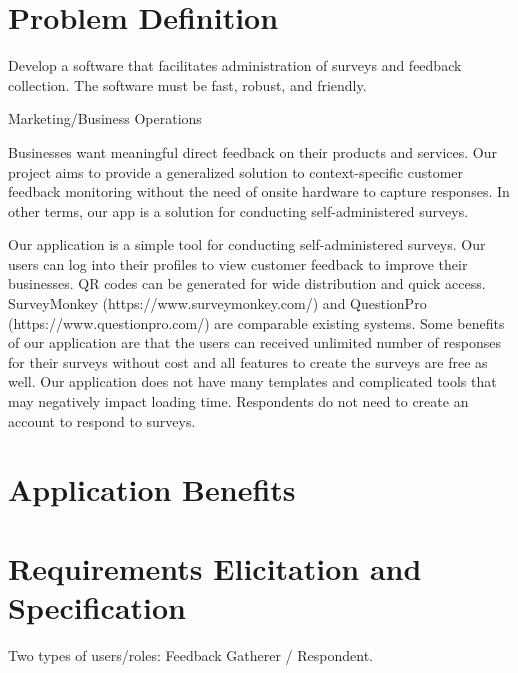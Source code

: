 \documentclass[letterpaper, 10 pt, conference]{ieeeconf}
\begin{document}
\thispagestyle{empty}
\pagestyle{empty}


\begin{abstract}
\end{abstract}


\section{Problem Definition}
Develop a software that facilitates administration of surveys and feedback collection. The software must be fast, robust, and friendly.

Marketing/Business Operations 

Businesses want meaningful direct feedback on their products and services. Our project aims to provide a generalized solution to context-specific customer feedback monitoring without the need of onsite hardware to capture responses. In other terms, our app is a solution for conducting self-administered surveys.

Our application is a simple tool for conducting self-administered surveys. Our users can log into their profiles to view customer feedback to improve their businesses. QR codes can be generated for wide distribution and quick access. SurveyMonkey (https://www.surveymonkey.com/) and QuestionPro (https://www.questionpro.com/) are comparable existing systems. Some benefits of our application are that the users can received unlimited number of responses for their surveys without cost and all features to create the surveys are free as well. Our application does not have many templates and complicated tools that may negatively impact loading time. Respondents do not need to create an account to respond to surveys. 


    

\section{Application Benefits}

\section{Requirements Elicitation and Specification}
Two types of users/roles: Feedback Gatherer / Respondent.
\end{document}
